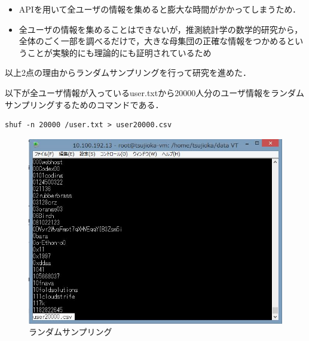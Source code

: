 \begin{itemize}
 \item APIを用いて全ユーザの情報を集めると膨大な時間がかかってしまうため．
 \item 全ユーザの情報を集めることはできないが，推測統計学の数学的研究から，全体のごく一部を調べるだけで，大きな母集団の正確な情報をつかめるということが実験的にも理論的にも証明されているため
 \end{itemize}

以上2点の理由からランダムサンプリングを行って研究を進めた．

以下が全ユーザ情報が入っているuser.txtから20000人分のユーザ情報をランダムサンプリングするためのコマンドである．

\par

\begin{lstlisting}[basicstyle=\ttfamily\footnotesize, frame=single]
shuf -n 20000 /user.txt > user20000.csv
\end{lstlisting}

\begin{figure}[htb]
\centering
\includegraphics[width=12cm]{rand.JPG}
\caption{ランダムサンプリング}\label{サンプル図}
\end{figure}

\newpage


 
